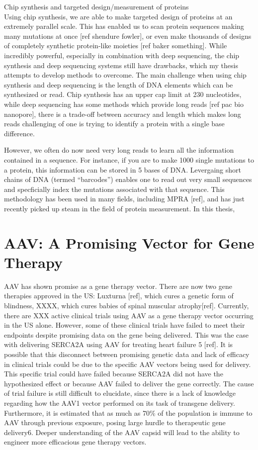 Chip synthesis and targeted design/measurement of proteins\\
Using chip synthesis, we are able to make targeted design of proteins at an extremely parallel scale. This has enabled us to scan protein sequences making many mutations at once [ref shendure fowler], or even make thousands of designs of completely synthetic protein-like moieties [ref baker something]. While incredibly powerful, especially in combination with deep sequencing, the chip synthesis and deep sequencing systems still have drawbacks, which my thesis attempts to develop methods to overcome. The main challenge when using chip synthesis and deep sequencing is the length of DNA elements which can be synthesized or read. Chip synthesis has an upper cap limit at 230 nucleotides, while deep sequencing has some methods which provide long reads [ref pac bio nanopore], there is a trade-off between accuracy and length which makes long reads challenging of one is trying to identify a protein with a single base difference. 

However, we often do now need very long reads to learn all the information contained in a sequence. For instance, if you are to make 1000 single mutations to a protein, this information can be stored in 5 bases of DNA. Levergaing short chains of DNA (termed ``barcodes'') enables one to read out very small sequences and specficially index the mutations associated with that sequence. This methodology has been used in many fields, including MPRA [ref], and has just recently picked up steam in the field of protein measurement. In this thesis, 



\section{AAV: A Promising Vector for Gene Therapy}

AAV has shown promise as a gene therapy vector. There are now two gene therapies approved in the US: Luxturna [ref], which cures a genetic form of blindness, XXXX, which cures babies of spinal muscular atrophy[ref]. Currently, there are XXX active clinical trials using AAV as a gene therapy vector occurring in the US alone. However, some of these clinical trials have failed to meet their endpoints despite promising data on the gene being delivered. This was the case with delivering SERCA2A using AAV for treating heart failure 5 [ref]. It is possible that this disconnect between promising genetic data and lack of efficacy in clinical trials could be due to the specific AAV vectors being used for delivery. This specific trial could have failed because SERCA2A did not have the hypothesized effect or because AAV failed to deliver the gene correctly. The cause of trial failure is still difficult to elucidate, since there is a lack of knowledge regarding how the AAV1 vector performed on its task of transgene delivery. Furthermore, it is estimated that as much as 70\% of the population is immune to AAV through previous exposure, posing large hurdle to therapeutic gene delivery6. Deeper understanding of the AAV capsid will lead to the ability to engineer more efficacious gene therapy vectors.

